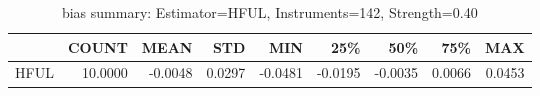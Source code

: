 \begin{table}[ht]
\centering
\caption{bias summary: Estimator=HFUL, Instruments=142, Strength=0.40}
\begin{tabular}{lrrrrrrrr}
\toprule
 & COUNT & MEAN & STD & MIN & 25\% & 50\% & 75\% & MAX \\
\midrule
HFUL & 10.0000 & -0.0048 & 0.0297 & -0.0481 & -0.0195 & -0.0035 & 0.0066 & 0.0453 \\
\bottomrule
\end{tabular}
\end{table}
